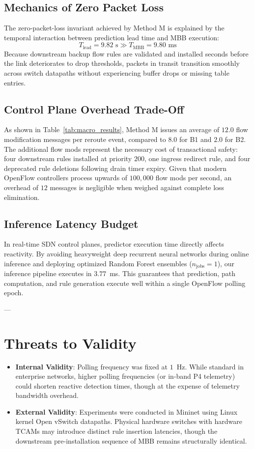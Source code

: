 \documentclass[10pt,twocolumn]{article}
\begin{document}
\subsection{Mechanics of Zero Packet Loss}
The zero-packet-loss invariant achieved by Method M is explained by the temporal interaction between prediction lead time and MBB execution:
$$T_{\text{lead}} = 9.82\text{ s} \gg T_{\text{MBB}} = 9.80\text{ ms}$$
Because downstream backup flow rules are validated and installed seconds before the link deteriorates to drop thresholds, packets in transit transition smoothly across switch datapaths without experiencing buffer drops or missing table entries.

\subsection{Control Plane Overhead Trade-Off}
As shown in Table~\ref{tab:macro_results}, Method M issues an average of $12.0$ flow modification messages per reroute event, compared to $8.0$ for B1 and $2.0$ for B2. The additional flow mods represent the necessary cost of transactional safety: four downstream rules installed at priority $200$, one ingress redirect rule, and four deprecated rule deletions following drain timer expiry. Given that modern OpenFlow controllers process upwards of $100{,}000$ flow mods per second, an overhead of $12$ messages is negligible when weighed against complete loss elimination.

\subsection{Inference Latency Budget}
In real-time SDN control planes, predictor execution time directly affects reactivity. By avoiding heavyweight deep recurrent neural networks during online inference and deploying optimized Random Forest ensembles ($n_{\text{jobs}} = 1$), our inference pipeline executes in $3.77$~ms. This guarantees that prediction, path computation, and rule generation execute well within a single OpenFlow polling epoch.

---

\section{Threats to Validity}
\label{sec:threats}
\begin{itemize}
    \item \textbf{Internal Validity}: Polling frequency was fixed at $1$~Hz. While standard in enterprise networks, higher polling frequencies (or in-band P4 telemetry) could shorten reactive detection times, though at the expense of telemetry bandwidth overhead.
    \item \textbf{External Validity}: Experiments were conducted in Mininet using Linux kernel Open vSwitch datapaths. Physical hardware switches with hardware TCAMs may introduce distinct rule insertion latencies, though the downstream pre-installation sequence of MBB remains structurally identical.
\end{itemize}
\end{document}
